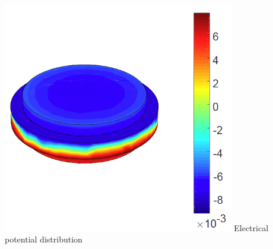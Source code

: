 \documentclass[compress]{beamer}
\begin{document}
\begin{frame}
\begin{columns}[totalwidth=\textwidth]
\begin{column}{.59\textwidth}
\begin{itemize}[label=$\bullet$, font=\small, leftmargin=*]
\end{itemize}
\end{column}
\begin{column}{.39\textwidth}
\centering
\includegraphics[width=0.79\textwidth]{Graphic/03_potencircle}
{\small Electrical potential distribution}
\end{column}
\end{columns}
\end{frame}
\end{document}
